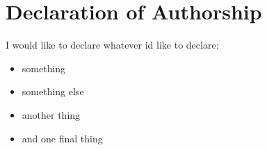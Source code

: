 \clearpage

\section*{Declaration of Authorship}

I would like to declare whatever id like to declare:

\begin{itemize}
 \item something
 \vspace*{3mm}
 \item something else
 \vspace*{3mm}
 \item another thing
 \vspace*{3mm}
 \item and one final thing
\end{itemize}